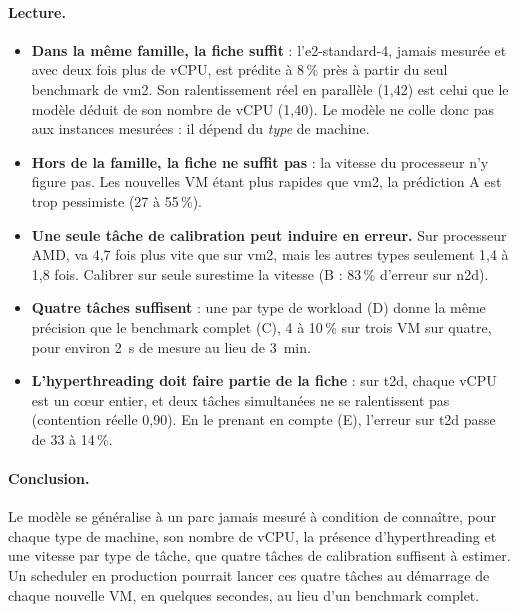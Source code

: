 \paragraph{Lecture.}
\begin{itemize}
  \item \textbf{Dans la même famille, la fiche suffit} : l'e2-standard-4, jamais
        mesurée et avec deux fois plus de vCPU, est prédite à 8\,\% près à partir du
        seul benchmark de vm2. Son ralentissement réel en parallèle (1,42) est
        celui que le modèle déduit de son nombre de vCPU (1,40). Le modèle ne colle
        donc pas aux instances mesurées : il dépend du \emph{type} de machine.
  \item \textbf{Hors de la famille, la fiche ne suffit pas} : la vitesse du
        processeur n'y figure pas. Les nouvelles VM étant plus rapides que vm2, la
        prédiction A est trop pessimiste (27 à 55\,\%).
  \item \textbf{Une seule tâche de calibration peut induire en erreur.} Sur
        processeur AMD,  va 4,7 fois plus vite que sur vm2, mais
        les autres types seulement 1,4 à 1,8 fois. Calibrer sur 
        seule surestime la vitesse (B : 83\,\% d'erreur sur n2d).
  \item \textbf{Quatre tâches suffisent} : une par type de workload (D) donne la
        même précision que le benchmark complet (C), 4 à 10\,\% sur trois VM sur
        quatre, pour environ 2~s de mesure au lieu de 3~min.
  \item \textbf{L'hyperthreading doit faire partie de la fiche} : sur t2d, chaque
        vCPU est un cœur entier, et deux tâches simultanées ne se ralentissent pas
        (contention réelle 0,90). En le prenant en compte (E), l'erreur sur t2d
        passe de 33 à 14\,\%.
\end{itemize}

\paragraph{Conclusion.} Le modèle se généralise à un parc jamais mesuré à
condition de connaître, pour chaque type de machine, son nombre de vCPU, la
présence d'hyperthreading et une vitesse par type de tâche, que quatre tâches de
calibration suffisent à estimer. Un scheduler en production pourrait lancer ces
quatre tâches au démarrage de chaque nouvelle VM, en quelques secondes, au lieu
d'un benchmark complet.
